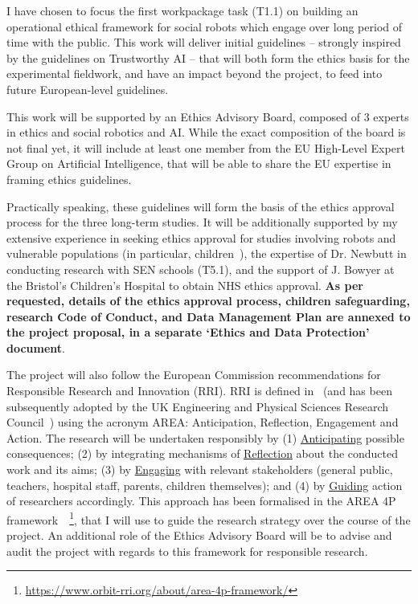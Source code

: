 I have chosen to focus the first workpackage task (T1.1) on building an
operational ethical framework for social robots which engage over long period of
time with the public. This work will deliver initial guidelines -- strongly
inspired by the guidelines on Trustworthy AI -- that will both form the ethics
basis for the \project experimental fieldwork, and have an impact beyond the
project, to feed into future European-level guidelines.

This work will be supported by an Ethics Advisory Board, composed of 3 experts
in ethics and social robotics and AI. While the exact composition of the board
is not final yet, it will include at least one member from the EU High-Level
Expert Group on Artificial Intelligence, that will be able to share the EU
expertise in framing ethics guidelines.

Practically speaking, these guidelines will form the basis of the ethics
approval process for the three long-term \project studies. It will be
additionally supported by my extensive experience in seeking ethics approval for
studies involving robots and vulnerable populations (in particular,
children~\cite{lemaignan2016learning,lemaignan2018pinsoro,senft2019teaching}),
the expertise of Dr. Newbutt in conducting research with SEN schools (T5.1), and
the support of J. Bowyer at the Bristol's Children's Hospital to obtain NHS ethics
approval. \textbf{As per requested, details of the ethics approval process,
children safeguarding, research Code of Conduct, and Data Management Plan are
annexed to the project proposal, in a separate `Ethics and Data Protection'
document}.

The project will also follow the European Commission recommendations for
Responsible Research and Innovation (RRI). RRI is defined
in~\cite{stilgoe2013developing} (and has been subsequently adopted by the UK Engineering
and Physical Sciences Research Council~\cite{owen2014uk}) using the acronym
AREA: Anticipation, Reflection, Engagement and Action. The \project research
will be undertaken responsibly by (1) \ul{Anticipating} possible consequences;
(2) by integrating mechanisms of \ul{Reflection} about the conducted work and its
aims; (3) by \ul{Engaging} with relevant stakeholders (general public, teachers,
hospital staff, parents, children themselves); and (4) by \ul{Guiding} action of
researchers accordingly. This approach has been formalised in the AREA 4P
framework~\cite{stahl2018implementing}~\footnote{\url{https://www.orbit-rri.org/about/area-4p-framework/}},
that I will use to guide the research strategy over the course of the project.
An additional role of the Ethics Advisory Board will be to advise and audit the
project with regards to this framework for responsible research.










